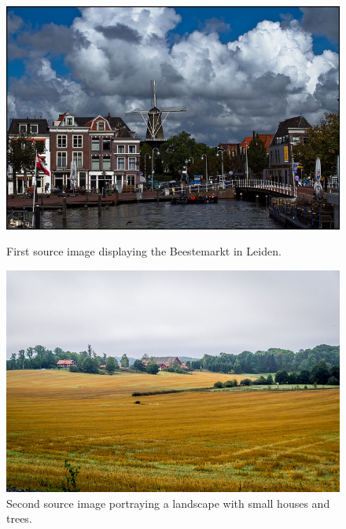 \begin{figure}[H]
	\centering
	\includegraphics[width=1\linewidth]{img/beestemarkt.jpg}
	\caption{First source image displaying the Beestemarkt in Leiden.\cite{imgbeestemarkt}}
	\label{fig:imgbeestemarkt}
	\endminipage\hfill
	\centering
	\includegraphics[width=1\linewidth]{img/landscape.jpg}
	\caption{Second source image portraying a landscape with small houses and trees.\cite{imglandscape}}
	\label{fig:imglandscape}
	\endminipage\hfill
\end{figure}